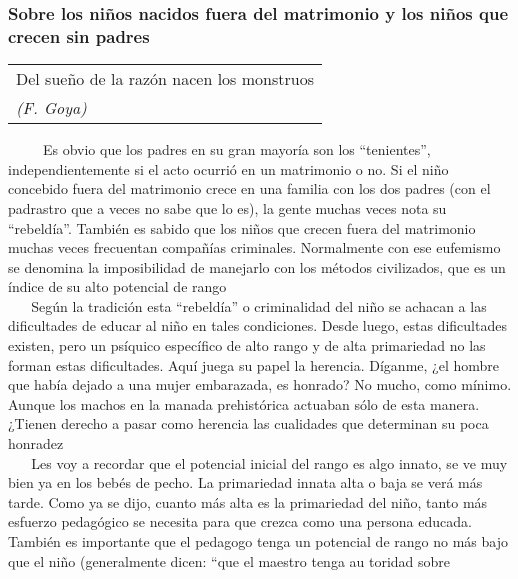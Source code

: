 \protect\hypertarget{M13}{}{}

\hypertarget{sobre-los-niuxf1os-nacidos-fuera-del-matrimonio-y-los-niuxf1os-que-crecen-sin-padres}{\subsubsection{Sobre
los niños nacidos fuera del matrimonio y los niños que crecen sin
padres}\label{sobre-los-niuxf1os-nacidos-fuera-del-matrimonio-y-los-niuxf1os-que-crecen-sin-padres}}

\begin{longtable}[]{@{}l@{}}
\toprule
Del sueño de la razón nacen los monstruos\tabularnewline
\emph{(F. Goya)}\tabularnewline
\bottomrule
\end{longtable}

~ ~ ~ Es obvio que los padres en su gran mayoría son los ``tenientes'',
independientemente si el acto ocurrió en un matrimonio o no. Si el niño
concebido fuera del matrimonio crece en una familia con los dos padres
(con el padrastro que a veces no sabe que lo es), la gente muchas veces
nota su ``rebeldía''. También es sabido que los niños que crecen fuera
del matrimonio muchas veces frecuentan compañías criminales. Normalmente
con ese eufemismo se denomina la imposibilidad de manejarlo con los
métodos civilizados, que es un índice de su alto potencial de rango\\
\hspace*{0.333em} ~ ~ Según la tradición esta ``rebeldía'' o
criminalidad del niño se achacan a las dificultades de educar al niño en
tales condiciones. Desde luego, estas dificultades existen, pero un
psíquico específico de alto rango y de alta primariedad no las forman
estas dificultades. Aquí juega su papel la herencia. Díganme, ¿el hombre
que había dejado a una mujer embarazada, es honrado? No mucho, como
mínimo. Aunque los machos en la manada prehistórica actuaban sólo de
esta manera. ¿Tienen derecho a pasar como herencia las cualidades que
determinan su poca honradez\\
\hspace*{0.333em} ~ ~ Les voy a recordar que el potencial inicial del
rango es algo innato, se ve muy bien ya en los bebés de pecho. La
primariedad innata alta o baja se verá más tarde. Como ya se dijo,
cuanto más alta es la primariedad del niño, tanto más esfuerzo
pedagógico se necesita para que crezca como una persona educada. También
es importante que el pedagogo tenga un potencial de rango no más bajo
que el niño (generalmente dicen: ``que el maestro tenga au toridad sobre
